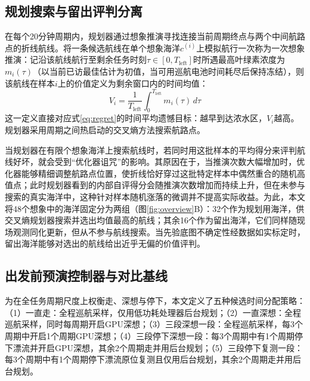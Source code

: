 \subsection{规划搜索与留出评判分离}

在每个20分钟周期内，规划器通过想象推演寻找连接当前周期终点与两个中间航路点的折线航线。将一条候选航线在单个想象海洋$c^{(i)}$上模拟航行一次称为一次想象推演：记沿该航线航行至剩余任务时刻$\tau \in [0, T_{\text{left}}]$时所遇最高叶绿素浓度为$m_i(\tau)$（以当前已访最佳估计为初值，当可用巡航电池时间耗尽后保持冻结），则该航线在样本$i$上的价值定义为剩余窗口内的时间均值：
\begin{equation}
  V_i = \frac{1}{T_{\text{left}}}\int_0^{T_{\text{left}}} m_i(\tau)\, d\tau
  \label{eq:route_value}
\end{equation}
这一定义直接对应式\eqref{eq:regret}的时间平均遗憾目标：越早到达浓水区，$V_i$越高。规划器采用周期之间热启动的交叉熵方法\cite{deboer2005cem}搜索航路点。

当规划器在有限个想象海洋上搜索航线时，若同时用这批样本的平均得分来评判航线好坏，就会受到“优化器诅咒”的影响\cite{smith2006curse, vanhasselt2010double}。其原因在于，当推演次数大幅增加时，优化器能够精细调整航路点位置，使折线恰好穿过这批特定样本中偶然重合的随机高值点；此时规划器看到的内部自评得分会随推演次数增加而持续上升，但在未参与搜索的真实海洋中，这种针对样本随机涨落的微调并不提高实际收益。为此，本文将48个想象中的海洋固定分为两组（图\ref{fig:overview}B）：32个作为规划用海洋，供交叉熵规划器搜索并选出均值最高的航线；其余16个作为留出海洋，它们同样随现场观测同化更新，但从不参与航线搜索。当先验底图不确定性经数据如实标定时，留出海洋能够对选出的航线给出近乎无偏的价值评判。

\subsection{出发前预演控制器与对比基线}

为在全任务周期尺度上权衡走、深想与停下，本文定义了五种候选时间分配策略：（1）一直走：全程巡航采样，仅用低功耗处理器后台规划；（2）一直深想：全程巡航采样，同时每周期开启GPU深想；（3）三段深想一段：全程巡航采样，每3个周期中开启1个周期GPU深想；（4）三段停下深想一段：每3个周期中有1个周期停下漂流并开启GPU深想，其余2个周期走并用后台规划；（5）三段停下复测一段：每3个周期中有1个周期停下漂流原位复测且仅用后台规划，其余2个周期走并用后台规划。

